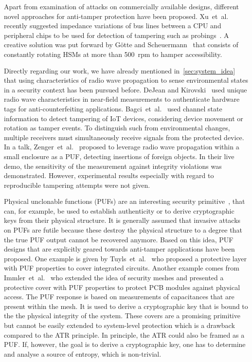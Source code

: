 \documentclass[conference]{IEEEtran}
\makeatletter
\newcommand{\etal}{et~al.\@\xspace}
\makeatother
\begin{document}
Apart from examination of attacks on commercially available designs, different novel approaches for anti-tamper protection have been proposed. Xu~\etal recently suggested impedance variations of bus lines between a CPU and peripheral chips to be used for detection of tampering such as probings~\cite{xuBusAuthenticationAntiProbing2020a}. A creative solution was put forward by G{\"o}tte and Scheuermann~\cite{cryptoeprint:2021:055} that consists of constantly rotating HSMs at more than \SI{500}{rpm} to hamper accessibility.

Directly regarding our work, we have already mentioned in~\autoref{sec:system_idea} that using characteristics of radio wave propagation to sense environmental states in a security context has been pursued before. DeJean and Kirovski~\cite{dejeanRFDNARadioFrequencyCertificates2007} used unique radio wave characteristics in near-field measurements to authenticate hardware tags for anti-counterfeiting applications. Bagci~\etal~\cite{bagciUsingChannelState2015} used channel state information to detect tampering of IoT devices, considering device movement or rotation as tamper events. To distinguish such from environmental changes, multiple receivers must simultaneously receive signals from the protected device. In a talk, Zenger~\etal~\cite{enc_puf_36c3} proposed to leverage radio wave propagation within a small enclosure as a PUF, detecting insertions of foreign objects. In their live demo, the sensitivity of the measurement against integrity violations was demonstrated. However, experimental results especially with regard to reproducible tampering attempts were not given.





Physical unclonable functions (PUFs) are an interesting security primitive~\cite{maesPufOverview}, that can, for example, be used to establish authenticity or to derive cryptographic keys from their physical structure. It is generally assumed that invasive attacks on PUFs are futile because these destroy the physical structure to a degree that the true PUF output cannot be recovered anymore.
Based on this idea, PUF designs that are explicitly geared towards anti-tamper applications have been proposed. One example is given by Tuyls~\etal~\cite{tuylsReadProofHardwareProtective2006} who proposed a protective layer with PUF properties to cover integrated circuits.
Another example comes from Immler~\etal~\cite{immlerSecurePhysicalEnclosures2018} who extended the idea of security meshes and presented a protective cover with PUF properties to protect PCB modules against physical access. The PUF response is based on measurements of capacitances that are present within the mesh. It is used to derive a cryptographic key that is bound to the the physical integrity of the system. These covers are a promising primitive but cannot be easily extended to system-level protection which is a drawback compared to the ATR principle. In principle, the ATR could also be framed as a PUF. If, however, the goal is to derive a cryptographic key, one has to determine and analyse a source of entropy, which is non-trivial.
\end{document}
